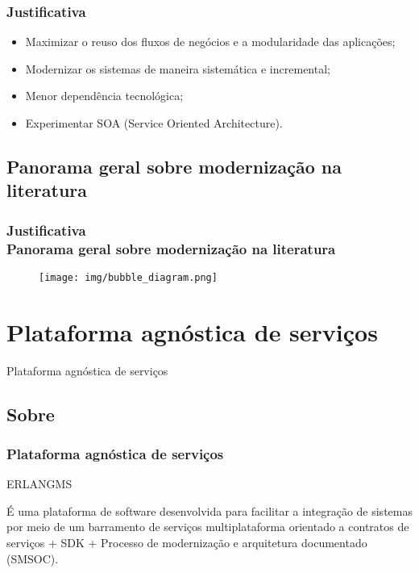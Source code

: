 \documentclass{beamer}
\begin{document}
\begin{frame}
  \frametitle{Justificativa}
  
    \begin{itemize}
       \item<1->Maximizar o reuso dos fluxos de negócios e a modularidade das aplicações;
       \item<1->Modernizar os sistemas de maneira sistemática e incremental;
       \item<1->Menor dependência tecnológica; 
       \item<1->Experimentar SOA (Service Oriented Architecture).
    \end{itemize}
    
\end{frame}


\subsection{Panorama geral sobre modernização na literatura}


\begin{frame}
  \frametitle{Justificativa \\ \small{Panorama geral sobre modernização na literatura}}

  	
	\begin{figure}
	\centering
		\texttt{[image: img/bubble\_diagram.png]}
	\end{figure}
  
\end{frame}





\section{Plataforma agnóstica de serviços}


\begin{frame}[c]{ }
\centering
  \huge{Plataforma agnóstica de serviços}
\end{frame}



\subsection{Sobre}


\begin{frame}
  \frametitle{Plataforma agnóstica de serviços}

  \begin{exampleblock}{ERLANGMS}
  
É uma plataforma de software desenvolvida para facilitar a integração de sistemas por meio de um barramento 
de serviços multiplataforma orientado a contratos de serviços + SDK + Processo de modernização e arquitetura documentado (SMSOC).

  \end{exampleblock}

  
\end{frame}
\end{document}
